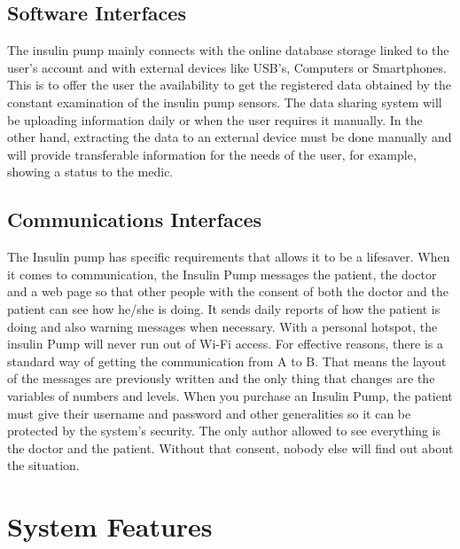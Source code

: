 \documentclass{scrreprt}
\begin{document}
\section{Software Interfaces}
The insulin pump mainly connects with the online database storage linked to the \gls{user}’s account and with 
external devices like USB’s, Computers or Smartphones. This is to offer the \gls{user} the availability to 
get the registered data obtained by the constant examination of the insulin pump sensors. The data 
sharing system will be uploading information daily or when the \gls{user} requires it manually. In the other 
hand, extracting the data to an external device must be done manually and will provide transferable 
information for the needs of the \gls{user}, for example, showing a status to the medic. 

\section{Communications Interfaces}
The Insulin pump has specific requirements that allows it to be a lifesaver. When it comes to 
communication, the Insulin Pump messages the \gls{patient}, the \gls{doctor} and a web page so that other people 
with the consent of both the \gls{doctor} and the \gls{patient} can see how he/she is doing. It sends daily reports 
of how the \gls{patient} is doing and also warning messages when necessary. With a personal hotspot, the 
insulin Pump will never run out of Wi-Fi access. For effective reasons, there is a standard way of 
getting the communication from A to B. That means the layout of the messages are previously written and 
the only thing that changes are the variables of numbers and levels. When you purchase an Insulin Pump, 
the \gls{patient} must give their username and password and other generalities so it can be protected by the 
system’s security. The only author allowed to see everything is the \gls{doctor} and the \gls{patient}. Without 
that consent, nobody else will find out about the situation.

\chapter{System Features}
\end{document}
